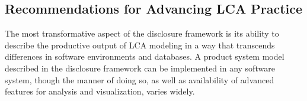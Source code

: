 \subsection{Recommendations for Advancing LCA Practice}

The most transformative aspect of the disclosure framework is its ability to describe the productive output of LCA modeling in a way that transcends differences in software environments and databases.  %
A product system model described in the disclosure framework can %
be implemented in any software system, though the manner of doing so, as well as availability of advanced features for analysis and visualization, varies widely.

